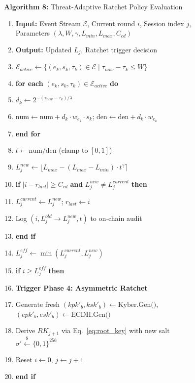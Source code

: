 \documentclass[journal, 10pt, twocolumn]{IEEEtran}
\begin{document}
\begin{figure}[!t]
\hrulefill
\vspace{-0.2cm}
\begin{center}
\textbf{Algorithm 8:} Threat-Adaptive Ratchet Policy Evaluation
\end{center}
\vspace{-0.2cm}
\hrulefill
\begin{enumerate}
    \item \textbf{Input:} Event Stream $\mathcal{E}$, Current round $i$, Session index $j$, Parameters $(\lambda, W, \gamma, L_{min}, L_{max}, C_{cd})$
    \item \textbf{Output:} Updated $L_j$, Ratchet trigger decision
    \item $\mathcal{E}_{active} \leftarrow \{(e_k, s_k, \tau_k) \in \mathcal{E} \mid \tau_{now} - \tau_k \leq W\}$
    \item \textbf{for each} $(e_k, s_k, \tau_k) \in \mathcal{E}_{active}$ \textbf{do}
    \item \quad $d_k \leftarrow 2^{-(\tau_{now} - \tau_k)/\lambda}$
    \item \quad $\text{num} \leftarrow \text{num} + d_k \cdot w_{e_k} \cdot s_k$; \quad $\text{den} \leftarrow \text{den} + d_k \cdot w_{e_k}$
    \item \textbf{end for}
    \item $t \leftarrow \text{num} / \text{den}$ \quad (clamp to $[0, 1]$)
    \item $L_j^{new} \leftarrow \lfloor L_{max} - (L_{max} - L_{min}) \cdot t^{\gamma} \rceil$
    \item \textbf{if} $|i - r_{last}| \geq C_{cd}$ \textbf{and} $L_j^{new} \neq L_j^{current}$ \textbf{then}
    \item \quad $L_j^{current} \leftarrow L_j^{new}$; \quad $r_{last} \leftarrow i$
    \item \quad Log $(i, L_j^{old} \to L_j^{new}, t)$ to on-chain audit
    \item \textbf{end if}
    \item $L_j^{eff} \leftarrow \min(L_j^{current}, L_j^{new})$
    \item \textbf{if} $i \geq L_j^{eff}$ \textbf{then}
    \item \quad \textbf{Trigger Phase 4: Asymmetric Ratchet}
    \item \quad Generate fresh $(kpk'_b, ksk'_b) \leftarrow \text{Kyber.Gen()}$, $(epk'_b, esk'_b) \leftarrow \text{ECDH.Gen()}$
    \item \quad Derive $RK_{j+1}$ via Eq.~\eqref{eq:root_key} with new salt $\sigma' \xleftarrow{\$} \{0,1\}^{256}$
    \item \quad Reset $i \leftarrow 0$, $j \leftarrow j+1$
    \item \textbf{end if}
\end{enumerate}
\hrulefill
\end{figure}
\end{document}
